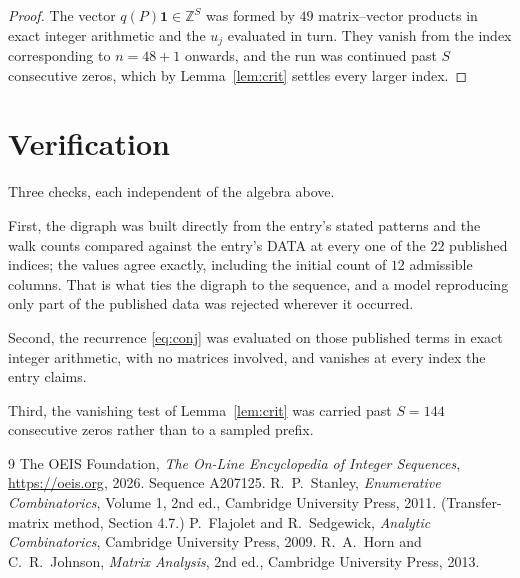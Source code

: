 \documentclass[11pt,a4paper]{article}
\theoremstyle{plain}
\theoremstyle{definition}
\begin{document}
\begin{proof}
The vector $q(P)\mathbf{1}\in\mathbb{Z}^{S}$ was formed by $49$ matrix--vector
products in exact integer arithmetic and the $u_j$ evaluated in turn. They vanish from the
index corresponding to $n=48+1$ onwards, and the run was continued past $S$ consecutive
zeros, which by Lemma~\ref{lem:crit} settles every larger index.
\end{proof}

\section{Verification}

Three checks, each independent of the algebra above.

First, the digraph was built directly from the entry's stated patterns and the walk counts
compared against the entry's DATA at every one of the $22$ published indices; the
values agree exactly, including the initial count of $12$ admissible columns. That is
what ties the digraph to the sequence, and a model reproducing only part of the published
data was rejected wherever it occurred.

Second, the recurrence \eqref{eq:conj} was evaluated on those published terms in exact
integer arithmetic, with no matrices involved, and vanishes at every index the entry claims.

Third, the vanishing test of Lemma~\ref{lem:crit} was carried past $S=144$ consecutive
zeros rather than to a sampled prefix.

\begin{thebibliography}{9}
 The OEIS Foundation, \emph{The On-Line Encyclopedia of Integer
Sequences}, \url{https://oeis.org}, 2026. Sequence A207125.
 R.~P.~Stanley, \emph{Enumerative Combinatorics}, Volume 1, 2nd ed.,
Cambridge University Press, 2011. (Transfer-matrix method, Section 4.7.)
 P.~Flajolet and R.~Sedgewick, \emph{Analytic Combinatorics}, Cambridge
University Press, 2009.
 R.~A.~Horn and C.~R.~Johnson, \emph{Matrix Analysis}, 2nd ed., Cambridge
University Press, 2013.
\end{thebibliography}
\end{document}
